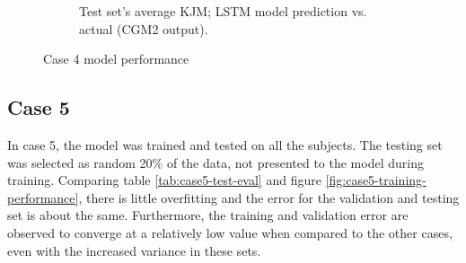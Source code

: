 \documentclass[../main.tex]{subfiles}
\begin{document}
\begin{figure}[!htb]
\begin{subfigure}[b]{0.515\textwidth}
         \caption{Test set's average \ac{KJM}; LSTM model prediction vs. actual (CGM2 output).}
         \label{fig:case4-prediction-performance}
     \end{subfigure}
    \caption{Case 4 model performance}
    \label{fig:case4-performance-plots}
\end{figure}


\subsection{Case 5}
\label{sec:results-case5}
In case 5, the model was trained and tested on all the subjects. 
The testing set was selected as random 20\% of the data, not presented to the model during training.
Comparing table \ref{tab:case5-test-eval} and figure \ref{fig:case5-training-performance}, there is little overfitting and the error for the validation and testing set is about the same.
Furthermore, the training and validation error are observed to converge at a relatively low value when compared to the other cases, even with the increased variance in these sets.
\end{document}

